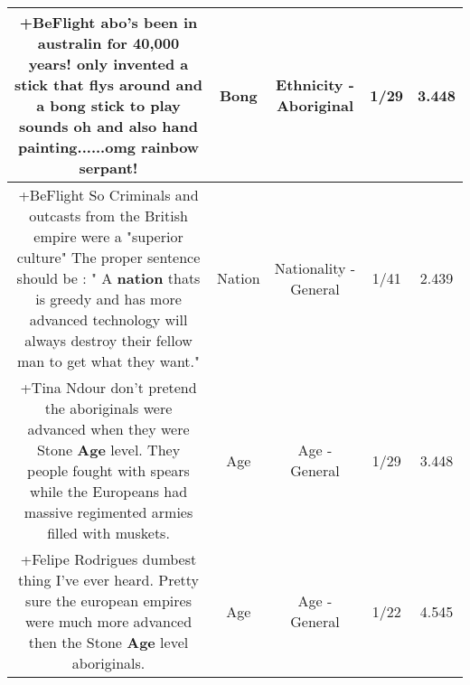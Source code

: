 \documentclass[11pt]{article}
\newlength\mylength
\begin{document}
\begin{center}
\begin{longtable}{|C{.65\mylength}|C{.30\mylength}|C{.12\mylength}|C{.12\mylength}|C{.12\mylength}|}
  \small +BeFlight abo's been in australin for 40,000 years! only invented a stick that flys around and a \textbf{bong} stick to play sounds oh and also hand painting......omg rainbow serpant!\normalsize   & Bong & Ethnicity - Aboriginal & 1/29 & 3.448 \\  \hline
  \small +BeFlight So Criminals and outcasts from the British empire were a "superior culture" The proper sentence should be : " A \textbf{nation} thats is greedy and has more advanced technology will always destroy their fellow man to get what they want."\normalsize   & Nation & Nationality - General & 1/41 & 2.439 \\  \hline
  \small +Tina Ndour don't pretend the aboriginals were advanced when they were Stone \textbf{Age} level. They people fought with spears while the Europeans had massive regimented armies filled with muskets.\normalsize   & Age & Age - General & 1/29 & 3.448 \\  \hline
  \small +Felipe Rodrigues dumbest thing I've ever heard. Pretty sure the european empires were much more advanced then the Stone \textbf{Age} level aboriginals.\normalsize   & Age & Age - General & 1/22 & 4.545 \\  \hline

\end{longtable}
\end{center}
\end{document}

